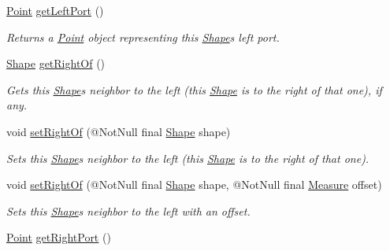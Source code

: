 \begin{DoxyCompactItemize}
\hyperlink{classcom_1_1aarrelaakso_1_1drawl_1_1_point}{Point} \hyperlink{classcom_1_1aarrelaakso_1_1drawl_1_1_shape_aeffa96786ca552adf46924ec77da9555}{get\+Left\+Port} ()
\begin{DoxyCompactList}\small\item\em Returns a \hyperlink{classcom_1_1aarrelaakso_1_1drawl_1_1_point}{Point} object representing this \hyperlink{classcom_1_1aarrelaakso_1_1drawl_1_1_shape}{Shape}\textquotesingle{}s left port. \end{DoxyCompactList}\item 
\hyperlink{classcom_1_1aarrelaakso_1_1drawl_1_1_shape}{Shape} \hyperlink{classcom_1_1aarrelaakso_1_1drawl_1_1_shape_a1ad573b06f341aa79f6a255a476ae6e4}{get\+Right\+Of} ()
\begin{DoxyCompactList}\small\item\em Gets this \hyperlink{classcom_1_1aarrelaakso_1_1drawl_1_1_shape}{Shape}\textquotesingle{}s neighbor to the left (this \hyperlink{classcom_1_1aarrelaakso_1_1drawl_1_1_shape}{Shape} is to the right of that one), if any. \end{DoxyCompactList}\item 
void \hyperlink{classcom_1_1aarrelaakso_1_1drawl_1_1_shape_a3cada5e03bd1552a79702d2945c7ed01}{set\+Right\+Of} (@Not\+Null final \hyperlink{classcom_1_1aarrelaakso_1_1drawl_1_1_shape}{Shape} shape)
\begin{DoxyCompactList}\small\item\em Sets this \hyperlink{classcom_1_1aarrelaakso_1_1drawl_1_1_shape}{Shape}\textquotesingle{}s neighbor to the left (this \hyperlink{classcom_1_1aarrelaakso_1_1drawl_1_1_shape}{Shape} is to the right of that one). \end{DoxyCompactList}\item 
void \hyperlink{classcom_1_1aarrelaakso_1_1drawl_1_1_shape_a89e85848d24dca0fa60ff68d169eef11}{set\+Right\+Of} (@Not\+Null final \hyperlink{classcom_1_1aarrelaakso_1_1drawl_1_1_shape}{Shape} shape, @Not\+Null final \hyperlink{classcom_1_1aarrelaakso_1_1drawl_1_1_measure}{Measure} offset)
\begin{DoxyCompactList}\small\item\em Sets this \hyperlink{classcom_1_1aarrelaakso_1_1drawl_1_1_shape}{Shape}\textquotesingle{}s neighbor to the left with an offset. \end{DoxyCompactList}\item 
\hyperlink{classcom_1_1aarrelaakso_1_1drawl_1_1_point}{Point} \hyperlink{classcom_1_1aarrelaakso_1_1drawl_1_1_shape_a319c78d425ec91e1aef1072a95e349ad}{get\+Right\+Port} ()

\end{DoxyCompactItemize}
